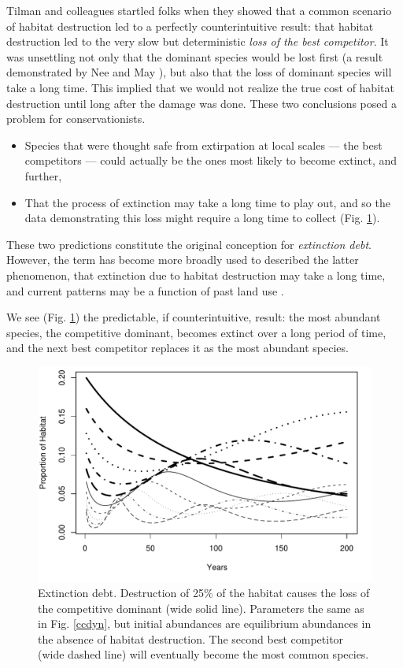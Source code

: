 Tilman and colleagues \cite{Tilman1994b} startled folks when they showed that a common scenario of habitat destruction led to a perfectly counterintuitive result: that habitat destruction led to the very slow but deterministic \emph{loss of the best competitor}. It was unsettling not only that the dominant species would be lost first (a result demonstrated by Nee and May \cite{Nee:1992vn}), but also that the loss of dominant species will take a long time. This implied that we would not realize the true cost of habitat destruction until long after the damage was done. These two conclusions posed a problem for conservationists.
\begin{itemize}
\item Species that were thought safe from extirpation at local scales --- the best competitors --- could actually be the ones most likely to become extinct, and further, 
  \item That the process of extinction may take a long time to play out, and so the data demonstrating this loss might require a long time to collect (Fig. \ref{fig:mhd}).
\end{itemize}
These two predictions constitute the original conception for \emph{extinction debt}. However, the term has become more broadly used to described the latter phenomenon, that extinction due to habitat destruction may take a long time, and current patterns may be a function of past land use \cite{Helm:2006nx,Lindborg:2004gc}.

We see (Fig. \ref{fig:mhd}) the predictable, if counterintuitive, result: the most abundant species, the competitive dominant, becomes extinct over a long period of time, and the next best competitor replaces it as the most abundant species.

\begin{figure}[ht]
\centering
\includegraphics[width=.67\textwidth]{MultiHD.pdf}
\caption{Extinction debt. Destruction of 25\% of the habitat causes the loss of the competitive dominant (wide solid line). Parameters the same as in Fig. \ref{ccdyn}, but initial abundances are equilibrium abundances in the absence of habitat destruction. The second best competitor (wide dashed line) will eventually become the most common species.}
\label{fig:mhd}
\end{figure}

